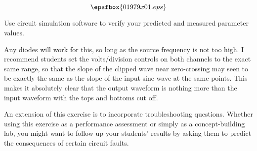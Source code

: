 

$$\epsfbox{01979x01.eps}$$

\vfil \eject






Use circuit simulation software to verify your predicted and measured parameter values.







Any diodes will work for this, so long as the source frequency is not too high.  I recommend students set the volts/division controls on both channels to the exact same range, so that the slope of the clipped wave near zero-crossing may seen to be exactly the same as the slope of the input sine wave at the same points.  This makes it absolutely clear that the output waveform is nothing more than the input waveform with the tops and bottoms cut off.

An extension of this exercise is to incorporate troubleshooting questions.  Whether using this exercise as a performance assessment or simply as a concept-building lab, you might want to follow up your students' results by asking them to predict the consequences of certain circuit faults.




